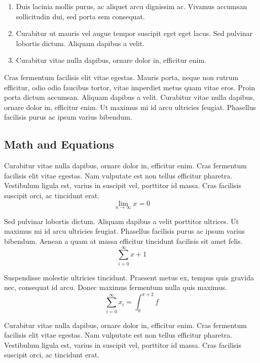 \documentclass[sigconf, nonacm]{acmart}
\begin{document}
\begin{enumerate}
\item Duis lacinia mollis purus, ac aliquet arcu dignissim ac. Vivamus accumsan sollicitudin dui, sed porta sem consequat.
\item Curabitur ut mauris vel augue tempor suscipit eget eget lacus. Sed pulvinar lobortis dictum. Aliquam dapibus a velit.
\item Curabitur vitae nulla dapibus, ornare dolor in, efficitur enim.
\end{enumerate}

Cras fermentum facilisis elit vitae egestas. Mauris porta, neque non rutrum efficitur, odio odio faucibus tortor, vitae imperdiet metus quam vitae eros. Proin porta dictum accumsan. Aliquam dapibus a velit. Curabitur vitae nulla dapibus, ornare dolor in, efficitur enim. Ut maximus mi id arcu ultricies feugiat. Phasellus facilisis purus ac ipsum varius bibendum.

\subsection{Math and Equations}

Curabitur vitae nulla dapibus, ornare dolor in, efficitur enim. Cras fermentum facilisis elit vitae egestas. Nam vulputate est non tellus efficitur pharetra. Vestibulum ligula est, varius in suscipit vel, porttitor id massa. Cras facilisis suscipit orci, ac tincidunt erat.
\begin{equation}
  \lim_{n\rightarrow \infty}x=0
\end{equation}

Sed pulvinar lobortis dictum. Aliquam dapibus a velit porttitor ultrices. Ut maximus mi id arcu ultricies feugiat. Phasellus facilisis purus ac ipsum varius bibendum. Aenean a quam at massa efficitur tincidunt facilisis sit amet felis. 
\begin{displaymath}
  \sum_{i=0}^{\infty} x + 1
\end{displaymath}

Suspendisse molestie ultricies tincidunt. Praesent metus ex, tempus quis gravida nec, consequat id arcu. Donec maximus fermentum nulla quis maximus.
\begin{equation}
  \sum_{i=0}^{\infty}x_i=\int_{0}^{\pi+2} f
\end{equation}

Curabitur vitae nulla dapibus, ornare dolor in, efficitur enim. Cras fermentum facilisis elit vitae egestas. Nam vulputate est non tellus efficitur pharetra. Vestibulum ligula est, varius in suscipit vel, porttitor id massa. Cras facilisis suscipit orci, ac tincidunt erat.
\end{document}
